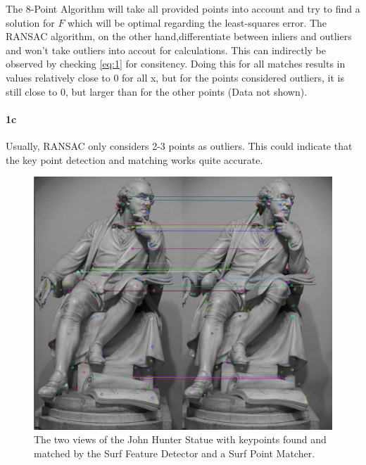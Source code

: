 \documentclass[11pt,a4paper]{article}
\begin{document}
The 8-Point Algorithm will take all provided points into account and try to find a solution for $F$ which will be optimal regarding the least-squares error. The RANSAC algorithm, on the other hand,differentiate between inliers and outliers and won't take outliers into accout for calculations. This can indirectly be observed by checking \ref{eq:1} for consitency. Doing this for all matches results in values relatively close to $0$ for all x, but for the points considered outliers, it is still close to $0$, but larger than for the other points (Data not shown).

\paragraph{1c}
Usually, RANSAC only considers 2-3 points as outliers. This could indicate that the key point detection and matching works quite accurate.
\begin{figure}
\includegraphics[scale=.4]{img/matches.png}
\caption{The two views of the John Hunter Statue with keypoints found and matched by the Surf Feature Detector and a Surf Point Matcher.}
\label{fig:1a}
\end{figure}
\end{document}
